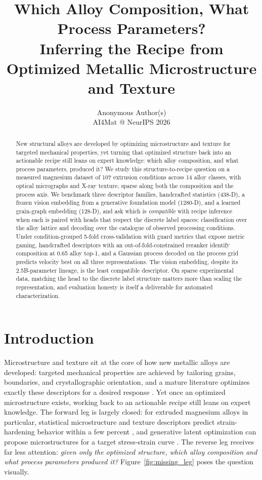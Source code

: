 \documentclass{article}
\title{Which Alloy Composition, What Process Parameters?\\
Inferring the Recipe from Optimized Metallic Microstructure and Texture}
\author{%
  Anonymous Author(s)\\
  AI4Mat @ NeurIPS 2026\\
}
\begin{document}
\maketitle

\begin{abstract}
New structural alloys are developed by optimizing microstructure and texture
for targeted mechanical properties, yet turning that optimized structure back
into an actionable recipe still leans on expert knowledge: which alloy
composition, and what process parameters, produced it? We study this
structure-to-recipe question on a measured magnesium dataset of 107 extrusion
conditions across 14 alloy classes, with optical micrographs and X-ray
texture, sparse along both the composition and the process axis. We benchmark
three descriptor families, handcrafted statistics (438-D), a frozen vision
embedding from a generative foundation model (1280-D), and a learned
grain-graph embedding (128-D), and ask which is \emph{compatible} with recipe
inference when each is paired with heads that respect the discrete label
spaces: classification over the alloy lattice and decoding over the catalogue
of observed processing conditions. Under condition-grouped 5-fold
cross-validation with guard metrics that expose metric gaming, handcrafted
descriptors with an out-of-fold-constrained reranker identify composition at
0.65 alloy top-1, and a Gaussian process decoded on the process grid predicts
velocity best on all three representations. The vision embedding, despite its
2.5B-parameter lineage, is the least compatible descriptor. On sparse
experimental data, matching the head to the discrete label structure matters
more than scaling the representation, and evaluation honesty is itself a
deliverable for automated characterization.
\end{abstract}

\section{Introduction}
\label{sec:intro}

Microstructure and texture sit at the core of how new metallic alloys are
developed: targeted mechanical properties are achieved by tailoring grains,
boundaries, and crystallographic orientation, and a mature literature optimizes
exactly these descriptors for a desired response \cite{Kambayashi31122025,Lin2026,Wu2021}. Yet once an optimized microstructure exists, working back to an
actionable recipe still leans on expert knowledge. The forward leg is largely
closed: for extruded magnesium alloys in particular, statistical microstructure
and texture descriptors predict strain-hardening behavior within a few percent \cite{Guru2025,INDURKAR2020102762,PAULSON2017428}, and generative latent optimization can propose
microstructures for a target stress-strain curve \cite{KUSAMPUDI2023103776}. The reverse leg receives far less attention:
\emph{given only the optimized structure, which alloy composition and what
process parameters produced it?} Figure~\ref{fig:missing_leg} poses the
question visually.
\end{document}
